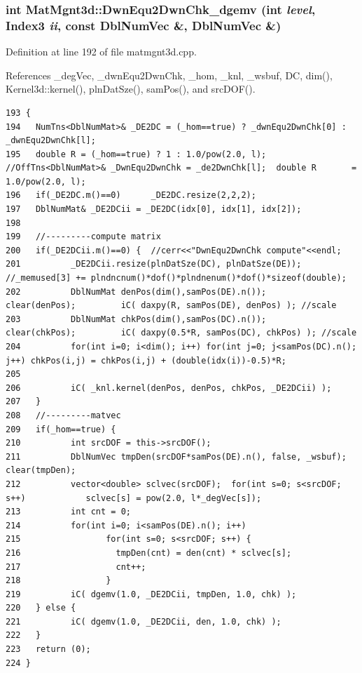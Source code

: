 \subsubsection{\setlength{\rightskip}{0pt plus 5cm}int Mat\-Mgnt3d::Dwn\-Equ2Dwn\-Chk\_\-dgemv (int {\em level}, Index3 {\em ii}, const Dbl\-Num\-Vec \&, Dbl\-Num\-Vec \&)}\label{classMatMgnt3d_87d8ed68b09cff332b257ad098ea81cc_87d8ed68b09cff332b257ad098ea81cc}




Definition at line 192 of file matmgnt3d.cpp.

References \_\-deg\-Vec, \_\-dwn\-Equ2Dwn\-Chk, \_\-hom, \_\-knl, \_\-wsbuf, DC, dim(), Kernel3d::kernel(), pln\-Dat\-Sze(), sam\-Pos(), and src\-DOF().

\footnotesize\begin{verbatim}193 {
194   NumTns<DblNumMat>& _DE2DC = (_hom==true) ? _dwnEqu2DwnChk[0] : _dwnEqu2DwnChk[l];
195   double R = (_hom==true) ? 1 : 1.0/pow(2.0, l);  //OffTns<DblNumMat>& _DwnEqu2DwnChk = _de2DwnChk[l];  double R       = 1.0/pow(2.0, l);
196   if(_DE2DC.m()==0)      _DE2DC.resize(2,2,2);
197   DblNumMat& _DE2DCii = _DE2DC(idx[0], idx[1], idx[2]);
198   
199   //---------compute matrix
200   if(_DE2DCii.m()==0) {  //cerr<<"DwnEqu2DwnChk compute"<<endl;
201          _DE2DCii.resize(plnDatSze(DC), plnDatSze(DE)); //_memused[3] += plndncnum()*dof()*plndnenum()*dof()*sizeof(double);
202          DblNumMat denPos(dim(),samPos(DE).n());                  clear(denPos);         iC( daxpy(R, samPos(DE), denPos) ); //scale
203          DblNumMat chkPos(dim(),samPos(DC).n());                  clear(chkPos);         iC( daxpy(0.5*R, samPos(DC), chkPos) ); //scale
204          for(int i=0; i<dim(); i++) for(int j=0; j<samPos(DC).n(); j++) chkPos(i,j) = chkPos(i,j) + (double(idx(i))-0.5)*R;
205          
206          iC( _knl.kernel(denPos, denPos, chkPos, _DE2DCii) );
207   }
208   //---------matvec
209   if(_hom==true) {
210          int srcDOF = this->srcDOF();
211          DblNumVec tmpDen(srcDOF*samPos(DE).n(), false, _wsbuf);         clear(tmpDen);
212          vector<double> sclvec(srcDOF);  for(int s=0; s<srcDOF; s++)            sclvec[s] = pow(2.0, l*_degVec[s]);
213          int cnt = 0;
214          for(int i=0; i<samPos(DE).n(); i++)
215                 for(int s=0; s<srcDOF; s++) {
216                   tmpDen(cnt) = den(cnt) * sclvec[s];
217                   cnt++;
218                 }
219          iC( dgemv(1.0, _DE2DCii, tmpDen, 1.0, chk) );
220   } else {
221          iC( dgemv(1.0, _DE2DCii, den, 1.0, chk) );
222   }
223   return (0);
224 }
\end{verbatim}\normalsize 


